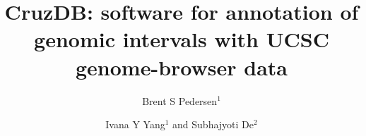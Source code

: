 \documentclass[10pt]{bmc_article}
\newenvironment{bmcformat}{\baselineskip20pt\sloppy\setboolean{publ}{false}}{\baselineskip20pt\sloppy}
\begin{document}
\begin{bmcformat}



\title{CruzDB: software for annotation of genomic intervals with UCSC genome-browser data}
 


\author{Brent S Pedersen\correspondingauthor$^1$%
       \and 
         Ivana Y Yang$^1$%
         and
         Subhajyoti De\correspondingauthor$^2$%
      }
      


\address{%
    \iid(1)University of Colorado, Anshutz Medical Campus, Department of Medicine %
        12700 East 19th Avenue, 8611 Aurora, CO 80045
    \iid(2)University of Colorado Cancer Center. 13001 E 17th Pl, Aurora, CO 80045
}%

\maketitle




\end{bmcformat}
\end{document}
